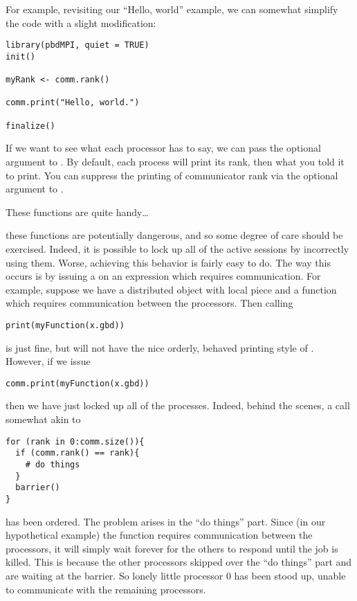 For example, revisiting our ``Hello, world'' example, we can somewhat
simplify the code with a slight modification:

\begin{lstlisting}[language=rr,title=Simple pbdMPI Example 3]
library(pbdMPI, quiet = TRUE)
init()

myRank <- comm.rank()

comm.print("Hello, world.")

finalize()
\end{lstlisting}

If we want to see what each processor has to say, we can pass the optional
argument  to . By default, each process
will print its rank, then what you told it to print. You can suppress the
printing of communicator rank via the optional argument 
to .

These functions are quite handy\dots
\begin{center}
\colorbox{yellow}{\Huge \color{red}{\#\#\#\#\# HOWEVER \#\#\#\#\# }}  
\end{center}
these functions are potentially dangerous, and so some degree of care
should be exercised. Indeed, it is possible to lock up all of the
active  sessions by incorrectly using them. Worse, achieving
this behavior is fairly easy to do. The way this occurs is by issuing
a  on an expression which requires communication.
For example, suppose we have a distributed object with local piece
 and a function  which requires
communication between the processors. Then calling
\begin{lstlisting}[language=rr,title=A Cautionary Tale of Printing in Parallel (1 of 3)]
print(myFunction(x.gbd)) 
\end{lstlisting}
is just fine, but will not have the nice orderly, behaved printing style
of . However, if we issue
\begin{lstlisting}[language=rr,title=A Cautionary Tale of Printing in Parallel (2 of 3)]
comm.print(myFunction(x.gbd)) 
\end{lstlisting}
then we have just locked up all of the  processes. Indeed,
behind the scenes, a call somewhat akin to
\begin{lstlisting}[language=rr]
for (rank in 0:comm.size()){
  if (comm.rank() == rank){
    # do things
  }
  barrier()
}
\end{lstlisting}
has been ordered. The problem arises in the ``do things'' part. Since
(in our hypothetical example) the function  requires
communication between the processors, it will simply wait forever for
the others to respond until the job is killed. This is because the other
processors skipped over the ``do things'' part and are waiting at the barrier.
So lonely little processor 0 has been stood up, unable to communicate with
the remaining processors.

